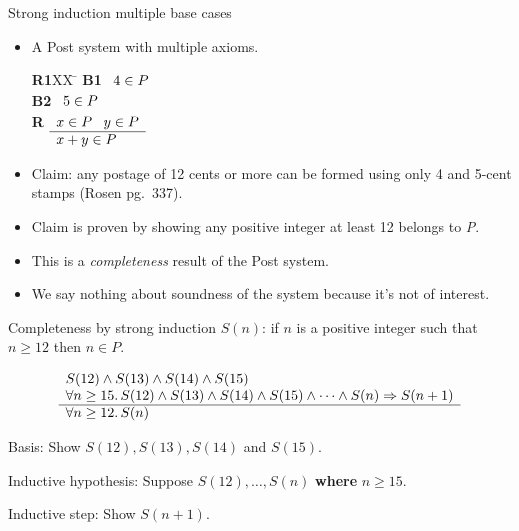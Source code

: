 \begin{wideslide}[bm=,toc=]{Strong induction multiple base cases}
\begin{itemize}
\item A Post system with multiple axioms.
\vspace{-1em}
\begin{tabbing}
{\bf R1}XX \=  \kill
{\bf B1} \>
        \(\begin{array}[t]{l}
        4\in P
        \end{array}\) \\[2ex]
{\bf B2} \>
        \(\begin{array}[t]{l}
        5\in P
        \end{array}\) \\[2ex]
        
{\bf R} \>
        \(\begin{array}[t]{l}
        x \in P \;\;\;y \in P \\
        \hline
        x + y \in P
        \end{array}\)
\end{tabbing}
\item Claim: any postage of 12 cents or more can be formed using only 4 and 5-cent stamps (Rosen pg.\ 337).
\item Claim is proven by showing any positive integer at least 12 belongs to {\em P\/}.
\item This is a {\em completeness\/} result of the Post system.
\item We say nothing about soundness of the system because it's not of interest. 
\end{itemize}
\end{wideslide}

\begin{wideslide}[bm=,toc=]{Completeness by strong induction}
$S(n)$: if $n$ is a positive integer such that $n\geq 12$ then $n\in P$.

\begin{displaymath}
\begin{array}[t]{l}
S(12) \wedge S(13) \wedge S(14) \wedge S(15) \\
\forall n\geq 15.\, S(12)\wedge S(13)\wedge S(14)\wedge S(15)\wedge\cdots\wedge S(n)\Rightarrow S(n+1) \\
\hline
\forall n\geq 12.\, S(n)
\end{array}
\end{displaymath}

\vspace{1em}
Basis: Show $S(12),S(13),S(14)$ and $S(15)$.

\vspace{1em}
Inductive hypothesis: Suppose $S(12), \ldots , S(n)$ {\bf where} $n\geq 15$.

\vspace{1em}
Inductive step: Show $S(n+1)$.
\end{wideslide}

